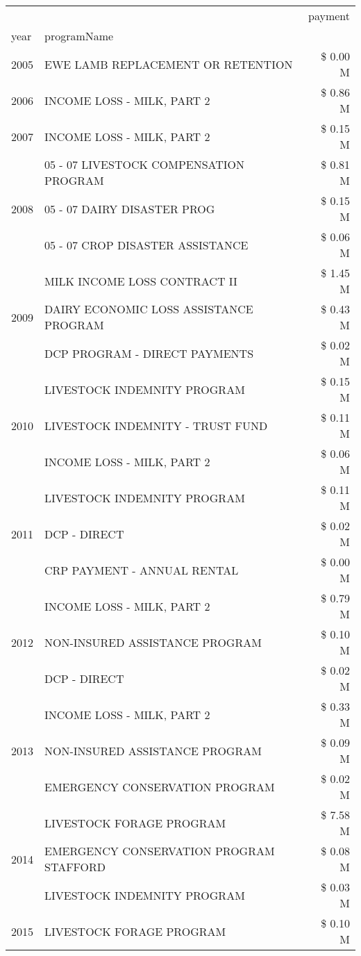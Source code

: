\begin{tabular}{llr}
\toprule
 &  & payment \\
year & programName &  \\
\midrule
2005 & EWE LAMB REPLACEMENT OR RETENTION & \$ 0.00 M \\
\cline{1-3}
2006 & INCOME LOSS - MILK, PART 2 & \$ 0.86 M \\
\cline{1-3}
2007 & INCOME LOSS - MILK, PART 2 & \$ 0.15 M \\
\cline{1-3}
\multirow[t]{3}{*}{2008} & 05 - 07 LIVESTOCK COMPENSATION PROGRAM & \$ 0.81 M \\
 & 05 - 07 DAIRY DISASTER PROG & \$ 0.15 M \\
 & 05 - 07 CROP DISASTER ASSISTANCE & \$ 0.06 M \\
\cline{1-3}
\multirow[t]{3}{*}{2009} & MILK INCOME LOSS CONTRACT II & \$ 1.45 M \\
 & DAIRY ECONOMIC LOSS ASSISTANCE PROGRAM & \$ 0.43 M \\
 & DCP PROGRAM - DIRECT PAYMENTS & \$ 0.02 M \\
\cline{1-3}
\multirow[t]{3}{*}{2010} & LIVESTOCK INDEMNITY PROGRAM & \$ 0.15 M \\
 & LIVESTOCK INDEMNITY - TRUST FUND & \$ 0.11 M \\
 & INCOME LOSS - MILK, PART 2 & \$ 0.06 M \\
\cline{1-3}
\multirow[t]{3}{*}{2011} & LIVESTOCK INDEMNITY PROGRAM & \$ 0.11 M \\
 & DCP - DIRECT & \$ 0.02 M \\
 & CRP PAYMENT - ANNUAL RENTAL & \$ 0.00 M \\
\cline{1-3}
\multirow[t]{3}{*}{2012} & INCOME LOSS - MILK, PART 2 & \$ 0.79 M \\
 & NON-INSURED ASSISTANCE PROGRAM & \$ 0.10 M \\
 & DCP - DIRECT & \$ 0.02 M \\
\cline{1-3}
\multirow[t]{3}{*}{2013} & INCOME LOSS - MILK, PART 2 & \$ 0.33 M \\
 & NON-INSURED ASSISTANCE PROGRAM & \$ 0.09 M \\
 & EMERGENCY CONSERVATION PROGRAM & \$ 0.02 M \\
\cline{1-3}
\multirow[t]{3}{*}{2014} & LIVESTOCK FORAGE PROGRAM & \$ 7.58 M \\
 & EMERGENCY CONSERVATION PROGRAM STAFFORD & \$ 0.08 M \\
 & LIVESTOCK INDEMNITY PROGRAM & \$ 0.03 M \\
\cline{1-3}
\multirow[t]{3}{*}{2015} & LIVESTOCK FORAGE PROGRAM & \$ 0.10 M \\

\end{tabular}
